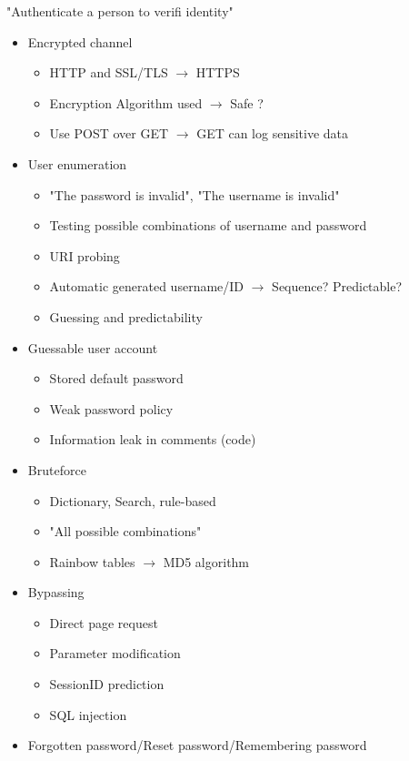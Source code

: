 "Authenticate a person to verifi identity"

	\begin{itemize}
		\item Encrypted channel
			\begin{itemize}
				\item HTTP and SSL/TLS $\rightarrow$ HTTPS
				\item Encryption Algorithm used $\rightarrow$ Safe ?
				\item Use POST over GET $\rightarrow$ GET can log sensitive data
			\end{itemize}
		\item User enumeration
			\begin{itemize}
				\item "The password is invalid", "The username is invalid"
				\item Testing possible combinations of username and password
				\item URI probing
				\item Automatic generated username/ID  $\rightarrow$ Sequence? Predictable?
				\item Guessing and predictability
			\end{itemize}
		\item Guessable user account
			\begin{itemize}
				\item Stored default password 
				\item Weak password policy
				\item Information leak in comments (code)
			\end{itemize}
		\item Bruteforce
			\begin{itemize}
				\item Dictionary, Search, rule-based
				\item "All possible combinations"
				\item Rainbow tables $\rightarrow$ MD5 algorithm
			\end{itemize}
		\item Bypassing
			\begin{itemize}
				\item Direct page request
				\item Parameter modification
				\item SessionID prediction
				\item SQL injection
			\end{itemize}
		\item Forgotten password/Reset password/Remembering password

\end{itemize}

